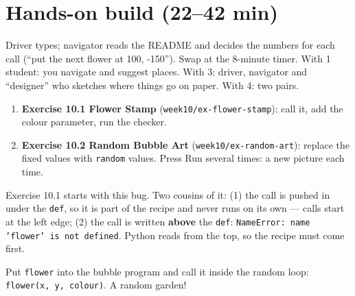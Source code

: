 \section{Hands-on build (22--42 min)}
\begin{pairroles}
Driver types; navigator reads the README and decides the numbers for each call (\enquote{put the next flower at 100, -150}). Swap at the 8-minute timer.
With 1 student: you navigate and suggest places. With 3: driver, navigator and \enquote{designer} who sketches where things go on paper. With 4: two pairs.
\end{pairroles}
\begin{enumerate}[leftmargin=1.4em,itemsep=2pt]
  \item \textbf{Exercise 10.1 Flower Stamp} (\texttt{week10/ex-flower-stamp}): call it, add the colour parameter, run the checker.
  \item \textbf{Exercise 10.2 Random Bubble Art} (\texttt{week10/ex-random-art}): replace the fixed values with \texttt{random} values. Press Run several times: a new picture each time.
\end{enumerate}
\begin{bughunt}
Exercise 10.1 starts with this bug. Two cousins of it: (1) the call is pushed in under the \texttt{def}, so it is part of the recipe and never runs on its own --- calls start at the left edge; (2) the call is written \textbf{above} the \texttt{def}: \texttt{NameError: name 'flower' is not defined}. Python reads from the top, so the recipe must come first.
\end{bughunt}
\begin{freebuild}
Put \texttt{flower} into the bubble program and call it inside the random loop: \texttt{flower(x, y, colour)}. A random garden!
\end{freebuild}

